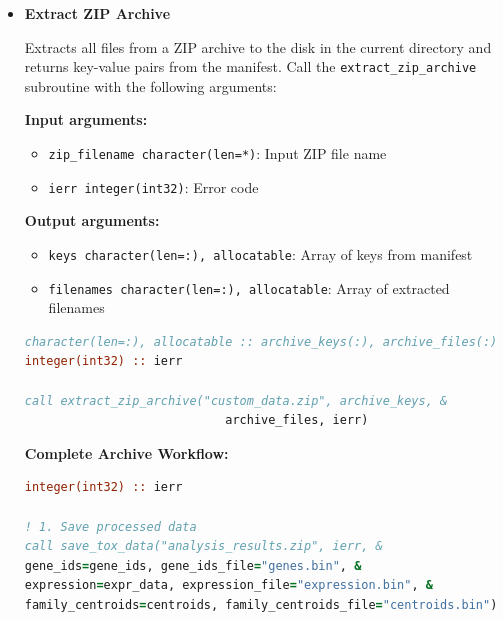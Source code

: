 \documentclass[11pt]{article}
\begin{document}
\begin{enumerate}
\begin{itemize}
\begin{lstlisting}[language=Fortran, caption={Create Custom Archive}]
call create_zip_archive("custom_data.zip", keys, files, ierr)
	      	      \end{lstlisting}
	      	      
	      	\item \textbf{Extract ZIP Archive}
	      	      
	      	      Extracts all files from a ZIP archive to the disk in the current directory
	      	      and returns key-value pairs from the manifest. Call the \texttt{extract\_zip\_archive}
	      	      subroutine with the following arguments:
	      	      
	      	      \textbf{Input arguments:}
	      	      \begin{itemize}
	      	      	\item \texttt{zip\_filename character(len=*)}: Input ZIP file name
	      	      	      
	      	      	\item \texttt{ierr integer(int32)}: Error code
	      	      \end{itemize}
	      	      \textbf{Output arguments:}
	      	      \begin{itemize}
	      	      	\item \texttt{keys character(len=:), allocatable}: Array of keys from
	      	      	      manifest
	      	      	      
	      	      	\item \texttt{filenames character(len=:), allocatable}: Array of extracted
	      	      	      filenames
	      	      \end{itemize}
	      	      \begin{lstlisting}[language=Fortran, caption={Extract Custom Archive}]
character(len=:), allocatable :: archive_keys(:), archive_files(:)
integer(int32) :: ierr

call extract_zip_archive("custom_data.zip", archive_keys, &
                            archive_files, ierr)
	      	      \end{lstlisting}
	      	      
	      	      \textbf{Complete Archive Workflow:} 
	      	      \begin{lstlisting}[language=Fortran, caption={Complete Archive Management Workflow}]
integer(int32) :: ierr

! 1. Save processed data
call save_tox_data("analysis_results.zip", ierr, &
gene_ids=gene_ids, gene_ids_file="genes.bin", &
expression=expr_data, expression_file="expression.bin", &
family_centroids=centroids, family_centroids_file="centroids.bin")


\end{lstlisting}
\end{itemize}
\end{enumerate}
\end{document}
